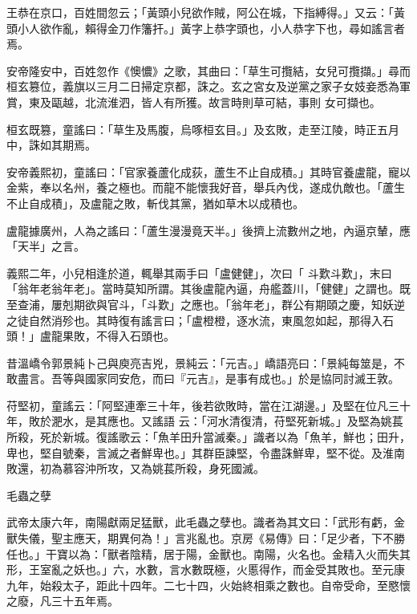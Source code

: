 \begin{pinyinscope}
 王恭在京口，百姓間忽云；「黃頭小兒欲作賊，阿公在城，下指縛得。」又云：「黃頭小人欲作亂，賴得金刀作籓扞。」黃字上恭字頭也，小人恭字下也，尋如謠言者焉。



 安帝隆安中，百姓忽作《懊憹》之歌，其曲曰：「草生可攬結，女兒可攬擷。」尋而桓玄篡位，義旗以三月二日掃定京都，誅之。玄之宮女及逆黨之家子女妓妾悉為軍賞，東及甌越，北流淮泗，皆人有所獲。故言時則草可結，事則
 女可擷也。



 桓玄既篡，童謠曰：「草生及馬腹，烏啄桓玄目。」及玄敗，走至江陵，時正五月中，誅如其期焉。



 安帝義熙初，童謠曰：「官家養蘆化成荻，蘆生不止自成積。」其時官養盧龍，寵以金紫，奉以名州，養之極也。而龍不能懷我好音，舉兵內伐，遂成仇敵也。「蘆生不止自成積」，及盧龍之敗，斬伐其黨，猶如草木以成積也。



 盧龍據廣州，人為之謠曰：「蘆生漫漫竟天半。」後擠上流數州之地，內逼京輦，應「天半」之言。



 義熙二年，小兒相逢於道，輒舉其兩手曰「盧健健」，次曰「
 斗歎斗歎」，末曰「翁年老翁年老」。當時莫知所謂。其後盧龍內逼，舟艦蓋川，「健健」之謂也。既至查浦，屢剋期欲與官斗，「斗歎」之應也。「翁年老」，群公有期頤之慶，知妖逆之徒自然消殄也。其時復有謠言曰；「盧橙橙，逐水流，東風忽如起，那得入石頭！」盧龍果敗，不得入石頭也。



 昔溫嶠令郭景純卜己與庾亮吉兇，景純云：「元吉。」嶠語亮曰：「景純每筮是，不敢盡言。吾等與國家同安危，而曰『元吉』，是事有成也。」於是協同討滅王敦。



 苻堅初，童謠云：「阿堅連牽三十年，後若欲敗時，當在江湖邊。」及堅在位凡三十年，敗於淝水，是其應也。又謠語
 云：「河水清復清，苻堅死新城。」及堅為姚萇所殺，死於新城。復謠歌云：「魚羊田升當滅秦。」識者以為「魚羊，鮮也；田升，卑也，堅自號秦，言滅之者鮮卑也。」其群臣諫堅，令盡誅鮮卑，堅不從。及淮南敗還，初為慕容沖所攻，又為姚萇所殺，身死國滅。



 毛蟲之孽



 武帝太康六年，南陽獻兩足猛獸，此毛蟲之孽也。識者為其文曰：「武形有虧，金獸失儀，聖主應天，期異何為！」言兆亂也。京房《易傳》曰：「足少者，下不勝任也。」干寶以為：「獸者陰精，居于陽，金獸也。南陽，火名也。金精入火而失其
 形，王室亂之妖也。」六，水數，言水數既極，火慝得作，而金受其敗也。至元康九年，始殺太子，距此十四年。二七十四，火始終相乘之數也。自帝受命，至愍懷之廢，凡三十五年焉。




\end{pinyinscope}

